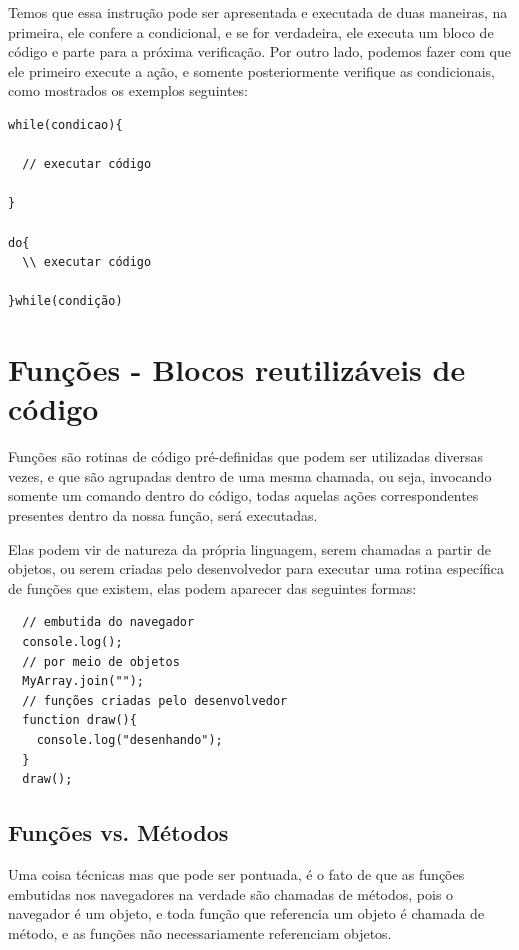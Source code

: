 \documentclass[12pt, a4paper]{paper}
\begin{document}
Temos que essa instrução pode ser apresentada e executada de duas maneiras, na primeira,
ele confere a condicional, e se for verdadeira, ele executa um bloco de código e parte 
para a próxima verificação. Por outro lado, podemos fazer com que ele primeiro execute 
a ação, e somente posteriormente verifique as condicionais, como mostrados os exemplos
seguintes: 

\begin{verbatim}
while(condicao){

  // executar código

}

do{
  \\ executar código

}while(condição)
\end{verbatim}


\section{Funções - Blocos reutilizáveis de código} %
\label{sec:Funções - Blocos reutilizáveis de código}
Funções são rotinas de código pré-definidas que podem ser utilizadas diversas vezes, e 
que são agrupadas dentro de uma mesma chamada, ou seja, invocando somente um comando 
dentro do código, todas aquelas ações correspondentes presentes dentro da nossa 
função, será executadas.

Elas podem vir de natureza da própria linguagem, serem chamadas a partir de objetos, ou 
serem criadas pelo desenvolvedor para executar uma rotina específica de funções que 
existem, elas podem aparecer das seguintes formas: 

\begin{verbatim}
  // embutida do navegador    
  console.log();
  // por meio de objetos 
  MyArray.join("");
  // funções criadas pelo desenvolvedor 
  function draw(){
    console.log("desenhando");
  }
  draw();
\end{verbatim}

\subsection{Funções vs. Métodos} %
\label{sub:Funções vs. Métodos}
Uma coisa técnicas mas que pode ser pontuada, é o fato de que as funções embutidas 
nos navegadores na verdade são chamadas de métodos, pois o navegador é um objeto, e 
toda função que referencia um objeto é chamada de método, e as funções não 
necessariamente referenciam objetos. 
\end{document}
